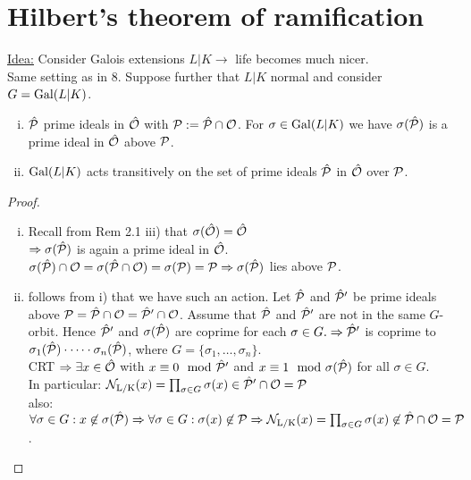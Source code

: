 \section{Hilbert's theorem of ramification}
\underline{Idea:} Consider Galois extensions $L|K \to $ life becomes much nicer.\\
Same setting as in 8. Suppose further that $L|K$ normal and consider $G=\operatorname{Gal}(L|K)$.

\begin{Bem}
\begin{enumerate}[i)]
\item $\hat{\mathcal{P}}$ prime ideals in $\hat{\mathcal{O}}$ with $\mathcal{P}:=\hat{\mathcal{P}} \cap \mathcal{O}$. For $\sigma \in \operatorname{Gal}(L|K)$ we have $\sigma(\hat{\mathcal{P}})$ is a prime ideal in $\hat{\mathcal{O}}$ above $\mathcal{P}$.
\item $\operatorname{Gal}(L|K)$ acts transitively on the set of prime ideals $\hat{\mathcal{P}}$ in $\hat{\mathcal{O}}$ over $\mathcal{P}$.
\end{enumerate}
\end{Bem}

\begin{proof}
\begin{enumerate}[i)]
\item Recall from Rem 2.1 iii) that $\sigma(\hat{\mathcal{O}}) = \hat{\mathcal{O}}$\\
$\Rightarrow \sigma(\hat{\mathcal{P}})$ is again a prime ideal in $\hat{\mathcal{O}}$.\\
$\sigma(\hat{\mathcal{P}}) \cap \mathcal{O} = \sigma(\hat{\mathcal{P}} \cap \mathcal{O}) = \sigma(\mathcal{P}) = \mathcal{P}\\
\Rightarrow \sigma(\hat{\mathcal{P}})$ lies above $\mathcal{P}$.
\item follows from i) that we have such an action. Let $\hat{\mathcal{P}}$ and $\hat{\mathcal{P}}'$ be prime ideals above $\mathcal{P} = \hat{\mathcal{P}} \cap \mathcal{O} = \hat{\mathcal{P}}' \cap \mathcal{O}$. Assume that $\hat{\mathcal{P}}$ and $\hat{\mathcal{P}}'$ are not in the same $G$-orbit. Hence $\hat{\mathcal{P}}'$ and $\sigma(\hat{\mathcal{P}})$ are coprime for each $\sigma \in G. \Rightarrow \hat{\mathcal{P}}'$ is coprime to $\sigma_1(\hat{\mathcal{P}}) \cdot \dots \cdot \sigma_n(\hat{\mathcal{P}})$, where $G= \{\sigma_1, \dots, \sigma_n\}$.\\
CRT $\Rightarrow \exists x \in \hat{\mathcal{O}}$ with $x \equiv 0 \mod {\hat{\mathcal{P}}}'$ and $x \equiv 1 \mod \sigma (\hat{\mathcal{P}})$ for all $\sigma \in G$.\\
In particular: $\operatorname{\mathcal{N}_{L/K}}(x)=\prod_{\sigma \in G} \sigma(x) \in \hat{\mathcal{P}}' \cap \mathcal{O} = \mathcal{P}$\\
also: $\forall \sigma \in G: x \not\in \sigma(\hat{\mathcal{P}}) \Rightarrow \forall \sigma \in G: \sigma(x) \not\in \mathcal{P}\\
 \Rightarrow \operatorname{\mathcal{N}_{L/K}}(x)=\prod_{\sigma \in G} \sigma(x) \not\in \hat{\mathcal{P}} \cap \mathcal{O} = \mathcal{P}$ \Lightning.
\end{enumerate}
\end{proof}

